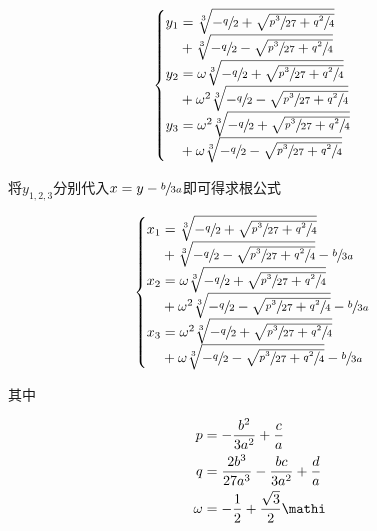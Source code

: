 \begin{align*}
  \begin{cases}
    y_1 = \sqrt[3]{-\sfrac q2 + \sqrt{\sfrac{p^3}{27} + \sfrac{q^2}4}} \\
    \phantom{y_1} + \sqrt[3]{-\sfrac q2 - \sqrt{\sfrac{p^3}{27} + \sfrac{q^2}4}} \\
    y_2 = \omega\sqrt[3]{-\sfrac q2 + \sqrt{\sfrac{p^3}{27} + \sfrac{q^2}4}} \\
    \phantom{y_2} + \omega^2\sqrt[3]{-\sfrac q2 - \sqrt{\sfrac{p^3}{27} + \sfrac{q^2}4}} \\
    y_3 = \omega^2\sqrt[3]{-\sfrac q2 + \sqrt{\sfrac{p^3}{27} + \sfrac{q^2}4}} \\
    \phantom{y_3} + \omega\sqrt[3]{-\sfrac q2 - \sqrt{\sfrac{p^3}{27} + \sfrac{q^2}4}} \\
  \end{cases}
\end{align*}

将$y_{1,2,3}$分别代入$x = y - \sfrac b{3a}$即可得求根公式

\begin{align*}
  \begin{cases}
    x_1 = \sqrt[3]{-\sfrac q2 + \sqrt{\sfrac{p^3}{27} + \sfrac{q^2}4}} \\
    \phantom{x_1} + \sqrt[3]{-\sfrac q2 - \sqrt{\sfrac{p^3}{27} + \sfrac{q^2}4}} - \sfrac b{3a} \\
    x_2 = \omega\sqrt[3]{-\sfrac q2 + \sqrt{\sfrac{p^3}{27} + \sfrac{q^2}4}} \\
    \phantom{x_2} + \omega^2\sqrt[3]{-\sfrac q2 - \sqrt{\sfrac{p^3}{27} + \sfrac{q^2}4}} - \sfrac b{3a} \\
    x_3 = \omega^2\sqrt[3]{-\sfrac q2 + \sqrt{\sfrac{p^3}{27} + \sfrac{q^2}4}} \\
    \phantom{x_3} + \omega\sqrt[3]{-\sfrac q2 - \sqrt{\sfrac{p^3}{27} + \sfrac{q^2}4}} - \sfrac b{3a} \\
  \end{cases}
\end{align*}

其中

\begin{align*}
  p &= -\frac{b^2}{3a^2} + \frac ca \\
  q &= \frac{2b^3}{27a^3} - \frac{bc}{3a^2} + \frac da \\
  \omega &= -\frac12 + \frac{\sqrt3}2\mathi \\
\end{align*}
